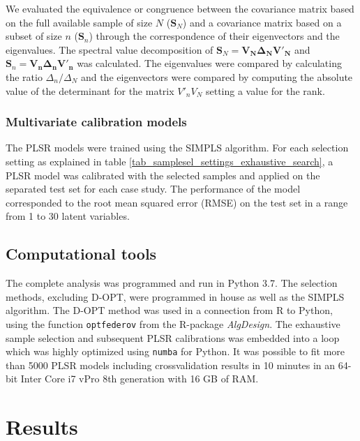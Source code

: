 \documentclass{article}
\begin{document}
We evaluated the equivalence or congruence between the covariance matrix based on the full available sample of size $N$ ($\mathbf{S}_N$) and a covariance matrix based on a subset of size $n$ ($\mathbf{S}_n$) through the correspondence of their eigenvectors and the eigenvalues. The spectral value decomposition of $\mathbf{S}_N = \mathbf{V_N \Delta_N V'_N}$ and $\mathbf{S}_n = \mathbf{V_n \Delta_n V'_n}$ was calculated. The eigenvalues were compared by calculating the ratio  $\Delta_n/\Delta_N$ and the eigenvectors were compared by computing the absolute value of the determinant for the matrix $V'_nV_N$ setting a value for the rank. 

\subsubsection*{Multivariate calibration models}

The PLSR models were trained using the SIMPLS algorithm. For each selection setting as explained in table \ref{tab_samplesel_settings_exhaustive_search}, a PLSR model was calibrated with the selected samples and applied on the separated test set for each case study. The performance of the model corresponded to the root mean squared error (RMSE) on the test set in a range from 1 to 30 latent variables. 

\subsection*{Computational tools}

The complete analysis was programmed and run in Python 3.7. The selection methods, excluding D-OPT, were programmed in house as well as the SIMPLS algorithm. The D-OPT method was used in a connection from R to Python, using the function \texttt{optfederov} from the R-package \emph{AlgDesign}. The exhaustive sample selection and subsequent PLSR calibrations was embedded into a loop which was highly optimized using \texttt{numba} for Python. It was possible to fit more than 5000 PLSR models including crossvalidation results in 10 minutes in an 64-bit Inter Core i7 vPro 8th generation with 16 GB of RAM. 



\section*{Results}\label{results}
\end{document}
